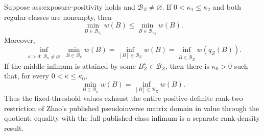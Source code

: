 Suppose ass:exposure-positivity holds and \(\mathcal B_Z\ne\varnothing\).  If \(0<\kappa_1\le\kappa_2\) and both regular classes are nonempty, then
\[
\min_{B\in\mathcal B_{\kappa_1}}w(B)
\le
\min_{B\in\mathcal B_{\kappa_2}}w(B).
\]
Moreover,
\[
\inf_{\substack{\kappa>0:\,\mathcal B_\kappa\ne\varnothing}}
\min_{B\in\mathcal B_\kappa}w(B)
=
\inf_{[B]\in\mathcal B_Z}w(B)
=
\inf_{B\in\widetilde{\mathcal B}_Z}w(q_Z(B)).
\]
If the middle infimum is attained by some \(B_Z^\star\in\mathcal B_Z\), then there is \(\kappa_0>0\) such that, for every \(0<\kappa\le\kappa_0\),
\[
\min_{B\in\mathcal B_\kappa}w(B)=\inf_{[B]\in\mathcal B_Z}w(B).
\]
Thus the fixed-threshold values exhaust the entire positive-definite rank-two restriction of Zhao's published pseudoinverse matrix domain in value through the quotient; equality with the full published-class infimum is a separate rank-density result.